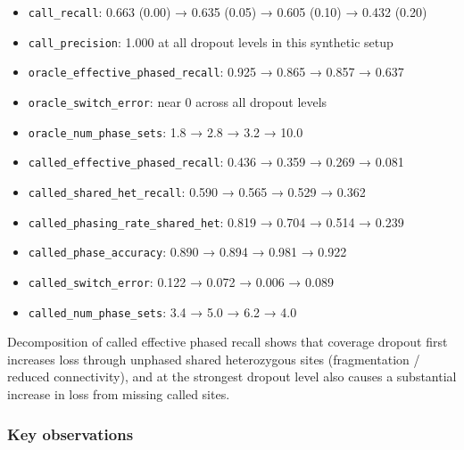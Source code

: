 \documentclass[
]{article}
\providecommand{\tightlist}{%
  \setlength{\itemsep}{0pt}\setlength{\parskip}{0pt}}
\begin{document}
\begin{itemize}
\tightlist
\item
  \texttt{call\_recall}: 0.663 (0.00) → 0.635 (0.05) → 0.605 (0.10) →
  0.432 (0.20)
\item
  \texttt{call\_precision}: 1.000 at all dropout levels in this
  synthetic setup
\item
  \texttt{oracle\_effective\_phased\_recall}: 0.925 → 0.865 → 0.857 →
  0.637
\item
  \texttt{oracle\_switch\_error}: near 0 across all dropout levels
\item
  \texttt{oracle\_num\_phase\_sets}: 1.8 → 2.8 → 3.2 → 10.0
\item
  \texttt{called\_effective\_phased\_recall}: 0.436 → 0.359 → 0.269 →
  0.081
\item
  \texttt{called\_shared\_het\_recall}: 0.590 → 0.565 → 0.529 → 0.362
\item
  \texttt{called\_phasing\_rate\_shared\_het}: 0.819 → 0.704 → 0.514 →
  0.239
\item
  \texttt{called\_phase\_accuracy}: 0.890 → 0.894 → 0.981 → 0.922
\item
  \texttt{called\_switch\_error}: 0.122 → 0.072 → 0.006 → 0.089
\item
  \texttt{called\_num\_phase\_sets}: 3.4 → 5.0 → 6.2 → 4.0
\end{itemize}

Decomposition of called effective phased recall shows that coverage
dropout first increases loss through unphased shared heterozygous sites
(fragmentation / reduced connectivity), and at the strongest dropout
level also causes a substantial increase in loss from missing called
sites.

\subsubsection{Key observations}\label{key-observations-2}
\end{document}
